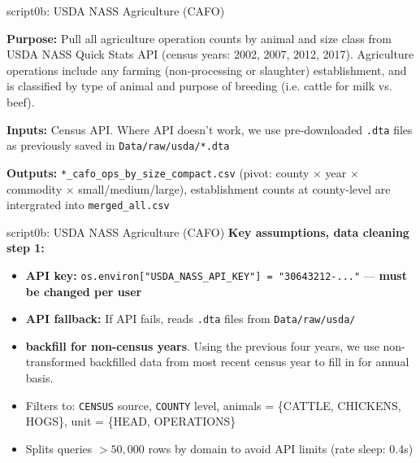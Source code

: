 \documentclass[aspectratio=169]{beamer}
\begin{document}
\begin{frame}{script0b: USDA NASS Agriculture (CAFO)}\label{0b}

\textbf{Purpose:} Pull all agriculture operation counts by animal and size class from USDA NASS Quick Stats API (census years: 2002, 2007, 2012, 2017). Agriculture operations include any farming (non-processing or slaughter) establishment, and is classified by type of animal and purpose of breeding (i.e. cattle for milk vs. beef). 


\textbf{Inputs:} Census API. Where API doesn't work, we use pre-downloaded \texttt{.dta} files as previously saved in \texttt{Data/raw/usda/*.dta}

\vspace{0.3em}
\textbf{Outputs:} \texttt{*\_cafo\_ops\_by\_size\_compact.csv} (pivot: county $\times$ year $\times$ commodity $\times$ small/medium/large), establishment counts at county-level are intergrated into \texttt{merged\_all.csv}

\end{frame}


\begin{frame}{script0b: USDA NASS Agriculture (CAFO)}
\vspace{0.3em}
\textbf{Key assumptions, data cleaning step 1: }
\begin{itemize}\small
    \item \textbf{API key:} \texttt{os.environ["USDA\_NASS\_API\_KEY"] = "30643212-..."} — \textbf{must be changed per user}
    \item \textbf{API fallback:} If API fails, reads \texttt{.dta} files from \texttt{Data/raw/usda/}
    \item \textbf{backfill for non-census years}. Using the previous four years, we use non-transformed backfilled data from most recent census year to fill in for annual basis.
    \item Filters to: \texttt{CENSUS} source, \texttt{COUNTY} level, animals = \{CATTLE, CHICKENS, HOGS\}, unit = \{HEAD, OPERATIONS\}
    \item Splits queries $>50{,}000$ rows by domain to avoid API limits (rate sleep: 0.4s)
\end{itemize}

\end{frame}
\end{document}
